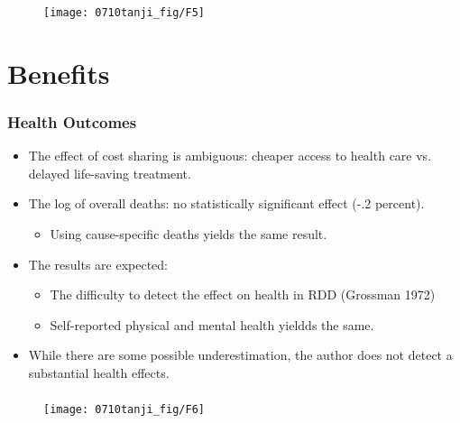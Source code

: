 \documentclass[dvipdfmx,11pt]{beamer}
\begin{document}
\begin{frame}\frametitle{}
  \begin{figure}[ht]
    \centering
    \texttt{[image: 0710tanji\_fig/F5]}
  \end{figure}
\end{frame}

\section{Benefits}
\frame{\sectionpage}

\begin{frame}\frametitle{Health Outcomes}
  \begin{itemize}
    \item The effect of cost sharing is ambiguous: cheaper access to health care vs. delayed life-saving treatment.
    \item The log of overall deaths: no statistically significant effect (-.2 percent).
    \begin{itemize}
      \item Using cause-specific deaths yields the same result.
    \end{itemize}
    \item The results are expected:
    \begin{itemize}
      \item The difficulty to detect the effect on health in RDD (Grossman 1972)
      \item Self-reported physical and mental health yieldds the same.
    \end{itemize}
    \item While there are some possible underestimation, the author does not detect a substantial health effects.
  \end{itemize}
\end{frame}

\begin{frame}\frametitle{}
  \begin{figure}[ht]
    \centering
    \texttt{[image: 0710tanji\_fig/F6]}
  \end{figure}
\end{frame}
\end{document}
